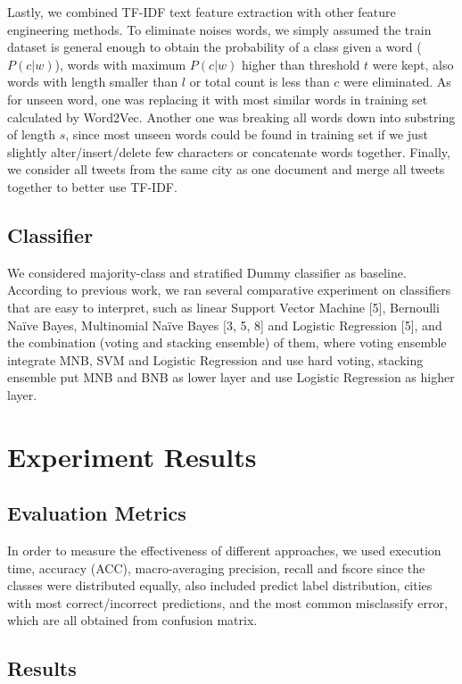 \documentclass[11pt]{article}
\begin{document}
Lastly, we combined TF-IDF text feature extraction with other feature engineering methods. To eliminate noises words, we simply assumed the train dataset is general enough to obtain the probability of a class given a word ($P(c|w)$), words with maximum $P(c|w)$ higher than threshold $t$ were kept, also words with length smaller than $l$ or total count is less than $c$ were eliminated. As for unseen word, one was replacing it with most similar words in training set calculated by Word2Vec. Another one was breaking all words down into substring of length $s$, since most unseen words could be found in training set if we just slightly alter/insert/delete few characters or concatenate words together. Finally, we consider all tweets from the same city as one document and merge all tweets together to better use TF-IDF.

\subsection{Classifier}

We considered majority-class and stratified Dummy classifier as baseline. According to previous work, we ran several comparative experiment on classifiers that are easy to interpret, such as linear Support Vector Machine [5], Bernoulli Naïve Bayes, Multinomial Naïve Bayes [3, 5, 8] and Logistic Regression [5], and the combination (voting and stacking ensemble) of them, where voting ensemble integrate MNB, SVM and Logistic Regression and use hard voting, stacking ensemble put MNB and BNB as lower layer and use Logistic Regression as higher layer.

\section{Experiment Results}

\subsection{Evaluation Metrics}

In order to measure the effectiveness of different approaches, we used execution time, accuracy (ACC), macro-averaging precision, recall and fscore since the classes were distributed equally, also included predict label distribution, cities with most correct/incorrect predictions, and the most common misclassify error, which are all obtained from confusion matrix.

\subsection{Results}
\end{document}
